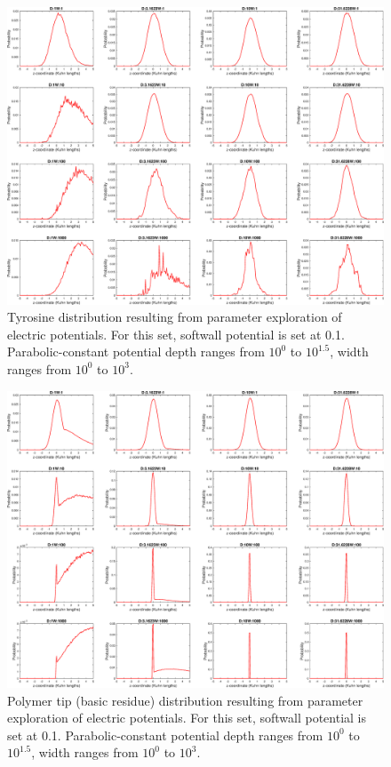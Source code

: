 \documentclass[../../AdvancementSummary.tex]{subfiles}
\begin{document}
\begin{figure}[H]
	\begin{center}
		\includegraphics[width=0.8\linewidth]{ResultsFigures/Electro/DistributioniSite2.eps}
	\end{center}
	\caption{Tyrosine distribution resulting from parameter exploration of electric potentials. For this set, softwall potential is set at 0.1. Parabolic-constant potential depth ranges from $10^0$ to $10^{1.5}$, width ranges from $10^0$ to $10^3$.\label{fig: iSiteDist}}
\end{figure}

\begin{figure}[H]
	\begin{center}
		\includegraphics[width=0.8\linewidth]{ResultsFigures/Electro/DistributioniSite7.eps}
	\end{center}
	\caption{Polymer tip (basic residue) distribution resulting from parameter exploration of electric potentials. For this set, softwall potential is set at 0.1. Parabolic-constant potential depth ranges from $10^0$ to $10^{1.5}$, width ranges from $10^0$ to $10^3$.\label{fig: tailDist}}
\end{figure}
\end{document}
